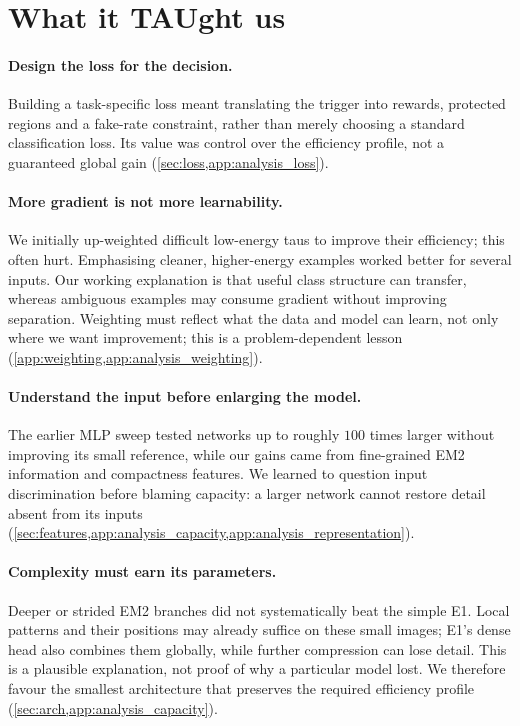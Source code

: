 \section{What it TAUght us}
\label{sec:lessons}

\paragraph{Design the loss for the decision.}
Building a task-specific loss meant translating the trigger into rewards, protected regions and a fake-rate constraint, rather than merely choosing a standard classification loss. Its value was control over the efficiency profile, not a guaranteed global gain (\cref{sec:loss,app:analysis_loss}).

\paragraph{More gradient is not more learnability.}
We initially up-weighted difficult low-energy taus to improve their efficiency; this often hurt. Emphasising cleaner, higher-energy examples worked better for several inputs. Our working explanation is that useful class structure can transfer, whereas ambiguous examples may consume gradient without improving separation. Weighting must reflect what the data and model can learn, not only where we want improvement; this is a problem-dependent lesson (\cref{app:weighting,app:analysis_weighting}).

\paragraph{Understand the input before enlarging the model.}
The earlier MLP sweep tested networks up to roughly $100$ times larger without improving its small reference, while our gains came from fine-grained EM2 information and compactness features. We learned to question input discrimination before blaming capacity: a larger network cannot restore detail absent from its inputs (\cref{sec:features,app:analysis_capacity,app:analysis_representation}).

\paragraph{Complexity must earn its parameters.}
Deeper or strided EM2 branches did not systematically beat the simple E1. Local patterns and their positions may already suffice on these small images; E1's dense head also combines them globally, while further compression can lose detail. This is a plausible explanation, not proof of why a particular model lost. We therefore favour the smallest architecture that preserves the required efficiency profile (\cref{sec:arch,app:analysis_capacity}).

